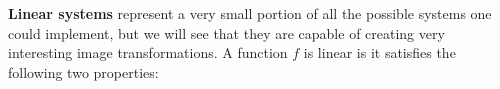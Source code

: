 %
%

  

{\bf Linear systems} 
represent a very small portion of all the possible systems one could implement, but we will see that they are capable of creating very interesting image transformations. A function $f$ is linear is it satisfies the following two properties: 

